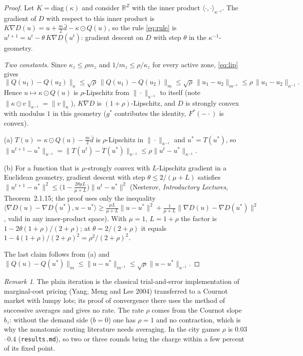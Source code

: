 \documentclass[11pt]{article}
\theoremstyle{definition}
\theoremstyle{remark}
\newtheorem{remark}[theorem]{Remark}
\newcommand{\R}{\mathbb{R}}
\newcommand{\ip}[2]{\langle #1,#2\rangle}
\newcommand{\dbar}{\bar d}
\newcommand{\norm}[2]{\|#1\|_{#2}}
\begin{document}
\begin{proof}
Let $K=\mathrm{diag}(\kappa)$ and consider $\R^Z$ with the inner product $\ip{\cdot}{\cdot}_{\kappa^{-1}}$. The gradient of $D$ with respect to this inner product is $K\nabla D(u)=u+\tfrac m2\dbar-\kappa\odot Q(u)$, so the rule \eqref{eq:rule} is $u^{t+1}=u^t-\theta\,K\nabla D(u^t)$: gradient descent on $D$ with step $\theta$ in the $\kappa^{-1}$-geometry.

\emph{Two constants.} Since $\kappa_z\le\rho m_z$ and $1/m_z\le\rho/\kappa_z$ for every active zone, \eqref{eq:lip} gives
\[\norm{Q(u_1)-Q(u_2)}{\kappa}\le\sqrt\rho\,\norm{Q(u_1)-Q(u_2)}{m}\le\sqrt\rho\,\norm{u_1-u_2}{m^{-1}}\le\rho\,\norm{u_1-u_2}{\kappa^{-1}}.\]
Hence $u\mapsto\kappa\odot Q(u)$ is $\rho$-Lipschitz from $\norm{\cdot}{\kappa^{-1}}$ to itself (note $\norm{\kappa\odot v}{\kappa^{-1}}=\norm v\kappa$), $K\nabla D$ is $(1+\rho)$-Lipschitz, and $D$ is strongly convex with modulus $1$ in this geometry ($g^*$ contributes the identity, $F^*(-\cdot)$ is convex).

(a) $T(u)=\kappa\odot Q(u)-\tfrac m2\dbar$ is $\rho$-Lipschitz in $\norm\cdot{\kappa^{-1}}$ and $u^*=T(u^*)$, so $\norm{u^{t+1}-u^*}{\kappa^{-1}}=\norm{T(u^t)-T(u^*)}{\kappa^{-1}}\le\rho\norm{u^t-u^*}{\kappa^{-1}}$.

(b) For a function that is $\mu$-strongly convex with $L$-Lipschitz gradient in a Euclidean geometry, gradient descent with step $\theta\le2/(\mu+L)$ satisfies $\norm{u^{t+1}-u^*}{}^2\le\big(1-\tfrac{2\theta\mu L}{\mu+L}\big)\norm{u^t-u^*}{}^2$ (Nesterov, \emph{Introductory Lectures}, Theorem~2.1.15; the proof uses only the inequality $\ip{\nabla D(u)-\nabla D(u^*)}{u-u^*}\ge\frac{\mu L}{\mu+L}\norm{u-u^*}{}^2+\frac1{\mu+L}\norm{\nabla D(u)-\nabla D(u^*)}{}^2$, valid in any inner-product space). With $\mu=1$, $L=1+\rho$ the factor is $1-2\theta(1+\rho)/(2+\rho)$; at $\theta=2/(2+\rho)$ it equals $1-4(1+\rho)/(2+\rho)^2=\rho^2/(2+\rho)^2$.

The last claim follows from (a) and $\norm{Q(u)-Q(u^*)}{m}\le\norm{u-u^*}{m^{-1}}\le\sqrt\rho\norm{u-u^*}{\kappa^{-1}}$.
\end{proof}

\begin{remark}
The plain iteration is the classical trial-and-error implementation of marginal-cost pricing (Yang, Meng and Lee 2004) transferred to a Cournot market with lumpy lots; its proof of convergence there uses the method of successive averages and gives no rate. The rate $\rho$ comes from the Cournot slope $b_z$: without the demand side ($b=0$) one has $\rho=1$ and no contraction, which is why the nonatomic routing literature needs averaging. In the city games $\rho$ is $0.03$--$0.4$ (\texttt{results.md}), so two or three rounds bring the charge within a few percent of its fixed point.
\end{remark}
\end{document}

